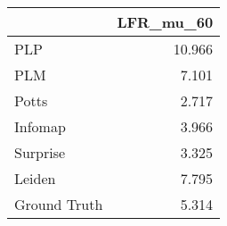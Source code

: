 \begin{tabular}{lr}
\toprule
{} & LFR_mu_60 \\
\midrule
PLP          &    10.966 \\
PLM          &     7.101 \\
Potts        &     2.717 \\
Infomap      &     3.966 \\
Surprise     &     3.325 \\
Leiden       &     7.795 \\
Ground Truth &     5.314 \\
\bottomrule
\end{tabular}
